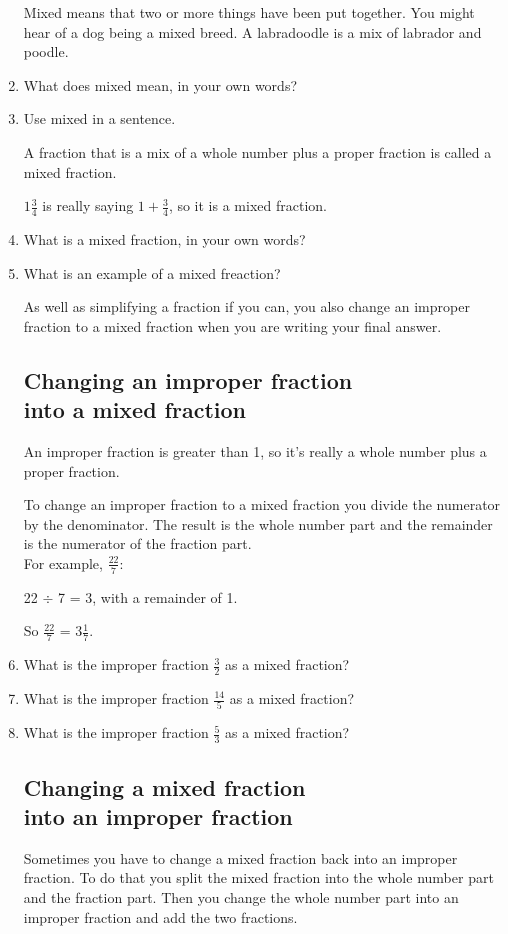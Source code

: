 \documentclass[14pt]{article}
\begin{document}
\begin{enumerate}
Mixed means that two or more things have been put together. You might hear of a dog being a mixed breed. A labradoodle is a mix of labrador and poodle.

\item What does mixed mean, in your own words?
\item Use mixed in a sentence.

A fraction that is a mix of a whole number plus a proper fraction is called a mixed fraction.

$1\frac{3}{4}$ is really saying $1 + \frac{3}{4}$, so it is a mixed fraction.

\item What is a mixed fraction, in your own words?
\item What is an example of a mixed freaction?

As well as simplifying a fraction if you can, you also change an improper fraction to a mixed fraction when you are writing your final answer.

\subsection*{Changing an improper fraction \\into a mixed fraction}
An improper fraction is greater than 1, so it's really a whole number plus a proper fraction.

To change an improper fraction to a mixed fraction you divide the numerator by the denominator. The result is the whole number part and the remainder is the numerator of the fraction part.\\

For example, $\frac{22}{7}$:

22 $\div$ 7 = 3, with a remainder of 1.

So $\frac{22}{7}$ = $3 \frac{1}{7}$.\\

\item What is the improper fraction $\frac{3}{2}$ as a mixed fraction?
\item What is the improper fraction $\frac{14}{5}$ as a mixed fraction?
\item What is the improper fraction $\frac{5}{3}$ as a mixed fraction?

\subsection*{Changing a mixed fraction \\ into an improper fraction}
Sometimes you have to change a mixed fraction back into an improper fraction. To do that you split the mixed fraction into the whole number part and the fraction part. Then you change the whole number part into an improper fraction and add the two fractions.


\end{enumerate}
\end{document}
